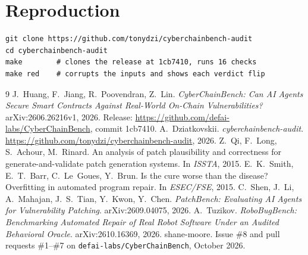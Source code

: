 \documentclass[11pt]{article}
\newcommand{\code}[1]{\texttt{\small #1}}
\begin{document}
\section*{Reproduction}
\begin{verbatim}
git clone https://github.com/tonydzi/cyberchainbench-audit
cd cyberchainbench-audit
make        # clones the release at 1cb7410, runs 16 checks
make red    # corrupts the inputs and shows each verdict flip
\end{verbatim}

\begin{thebibliography}{9}
 J.~Huang, F.~Jiang, R.~Poovendran, Z.~Lin. \emph{CyberChainBench: Can AI Agents Secure Smart Contracts Against Real-World On-Chain Vulnerabilities?} arXiv:2606.26216v1, 2026. Release: \url{https://github.com/defai-labs/CyberChainBench}, commit 1cb7410.
 A.~Dziatkovskii. \emph{cyberchainbench-audit}. \url{https://github.com/tonydzi/cyberchainbench-audit}, 2026.
 Z.~Qi, F.~Long, S.~Achour, M.~Rinard. An analysis of patch plausibility and correctness for generate-and-validate patch generation systems. In \emph{ISSTA}, 2015.
 E.~K.~Smith, E.~T.~Barr, C.~Le~Goues, Y.~Brun. Is the cure worse than the disease? Overfitting in automated program repair. In \emph{ESEC/FSE}, 2015.
 C.~Shen, J.~Li, A.~Mahajan, J.~S.~Tian, Y.~Kwon, Y.~Chen. \emph{PatchBench: Evaluating AI Agents for Vulnerability Patching}. arXiv:2609.04075, 2026.
 A.~Tuzikov. \emph{RoboBugBench: Benchmarking Automated Repair of Real Robot Software Under an Audited Behavioral Oracle}. arXiv:2610.16369, 2026.
 shane-moore. Issue \#8 and pull requests \#1--\#7 on \code{defai-labs/CyberChainBench}, October 2026.
\end{thebibliography}
\end{document}
